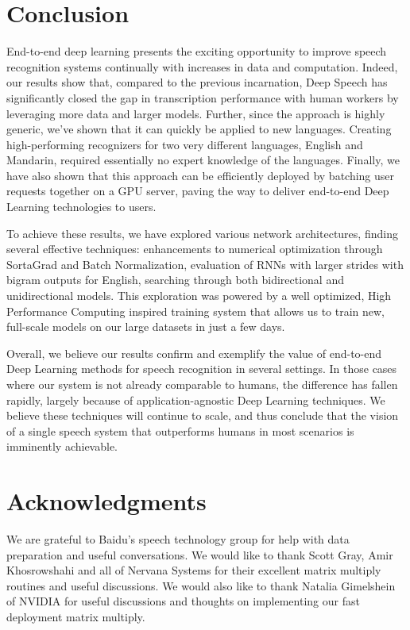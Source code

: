 \documentclass{article}
\begin{document}
\section{Conclusion}
End-to-end deep learning presents the exciting opportunity to improve speech recognition systems continually with increases in data and computation.  Indeed, our results show that, compared to the previous incarnation, Deep Speech has significantly closed the gap in transcription performance with human workers by leveraging more data and larger models.  Further, since the approach is highly generic, we've shown that it can quickly be applied to new languages. Creating high-performing recognizers for two very different languages, English and Mandarin, required essentially no expert knowledge of the languages.  Finally, we have also shown that this approach can be efficiently deployed by batching user requests together on a GPU server, paving the way to deliver end-to-end Deep Learning technologies to users. 

To achieve these results, we have explored various network architectures, finding several effective techniques:  enhancements to numerical optimization through SortaGrad and Batch Normalization, evaluation of RNNs with larger strides with bigram outputs for English, searching through both bidirectional and unidirectional models. This exploration was powered by a well optimized, High Performance Computing inspired training system that allows us to train new, full-scale models on our large datasets in just a few days.

Overall, we believe our results confirm and exemplify the value of end-to-end Deep Learning methods for speech recognition in several settings.  In those cases where our system is not already comparable to humans, the difference has fallen rapidly, largely because of application-agnostic Deep Learning techniques.  We believe these techniques will continue to scale, and thus conclude that the vision of a single speech system that outperforms humans in most scenarios is imminently achievable.

\section*{Acknowledgments} 
We are grateful to Baidu's speech technology group for help with data preparation and useful conversations. We would like to thank Scott Gray, Amir Khosrowshahi and all of Nervana Systems for their excellent matrix multiply routines and useful discussions.  We would also like to thank Natalia Gimelshein of NVIDIA  for useful discussions and thoughts on implementing our fast deployment matrix multiply. 
\end{document}
